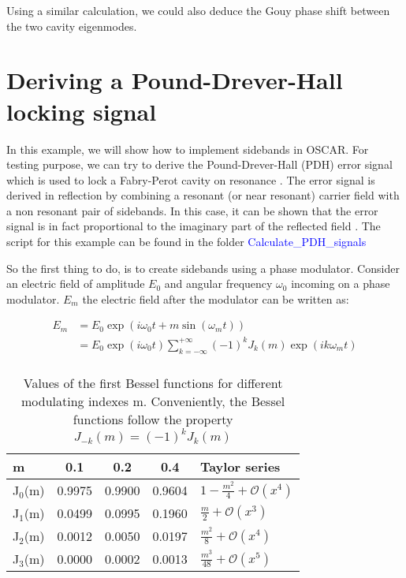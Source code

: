 Using a similar calculation, we could also deduce the Gouy phase shift between the two cavity eigenmodes.

\section{Deriving a Pound-Drever-Hall locking signal}
\label{cha3.4}

In this example, we will show how to implement sidebands in OSCAR. For testing purpose, we can try to derive the Pound-Drever-Hall (PDH) error signal which is used to lock a Fabry-Perot cavity on resonance \cite{PDH}. The error signal is derived in reflection by combining a resonant (or near resonant) carrier field with a non resonant pair of sidebands. In this case, it can be shown that the error signal is in fact proportional to the imaginary part of the reflected field \cite{black:79}. The script for this example can be found in the folder \textcolor{blue}{Calculate\_PDH\_signals}

So the first thing to do, is to create sidebands using a phase modulator. Consider an electric field of amplitude $E_0$ and angular frequency $\omega_0$ incoming on a phase modulator. $E_m$ the electric field after the modulator can be written as:

\begin{equation}
\begin{split}
E_m & = E_0 \exp(i \omega_0 t + m \sin(\omega_m t))\\
    & = E_0 \exp(i \omega_0 t) \sum_{k = -\infty}^{+\infty} (-1)^k J_k(m) \exp(i k \omega_m t) \\
\end{split}
\label{eq3:bessel}
\end{equation}

\begin{table}[tbp]
  \centering
  \caption{\label{tab3:bessel} Values of the first Bessel functions for different modulating indexes m. Conveniently, the Bessel functions follow the property $J_{-k}(m) = (-1)^k J_{k}(m)$ }
\begin{tabular}{|l c c c|l|}
\hline
{\Large\strut} m & 0.1 & 0.2 & 0.4 & Taylor series\\
\hline
{\Large\strut} J$_0$(m) & 0.9975 & 0.9900 & 0.9604 & $1 - \frac{m^2}{4} + \mathcal{O}(x^4)$\\
{\Large\strut} J$_1$(m) & 0.0499 & 0.0995 & 0.1960 & $\frac{m}{2} + \mathcal{O}(x^3)$\\
{\Large\strut} J$_2$(m) & 0.0012 & 0.0050 & 0.0197 & $\frac{m^2}{8} + \mathcal{O}(x^4)$\\
{\Large\strut} J$_3$(m) & 0.0000 & 0.0002 & 0.0013 & $\frac{m^3}{48} + \mathcal{O}(x^5)$\\
\hline
\end{tabular}
\end{table}

